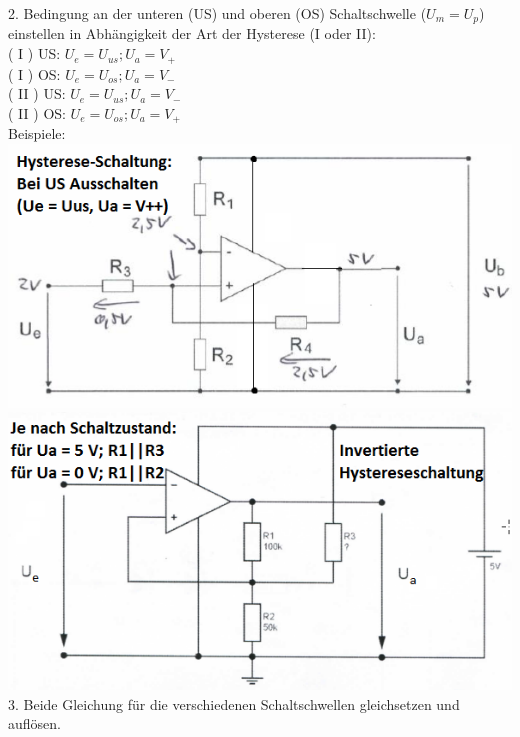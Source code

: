 \documentclass[fs, footer]{latex4ei}
\begin{document}
\begin{multicols*}{4}
{2. Bedingung an der unteren (US) und oberen (OS) Schaltschwelle ($U_m = U_p$) einstellen in Abhängigkeit der Art der Hysterese (I oder II): \\
 ( I ) US: $ U_e = U_{us}; U_a = V_{+} $ \\
 ( I ) OS: $ U_e = U_{os}; U_a = V_{-} $ \\
 ( II ) US: $ U_e = U_{us}; U_a = V_{-} $ \\
 ( II ) OS: $ U_e = U_{os}; U_a = V_{+} $ \\
 
 Beispiele: \\
 \includegraphics[scale = 0.4]{./img/Hystereseschaltung.png} \\
 \includegraphics[scale = 0.4]{./img/Hystereseschaltung_invert.png} \\
 

3. Beide Gleichung für die verschiedenen Schaltschwellen gleichsetzen und auflösen.\\
}




\end{multicols*}
\end{document}
